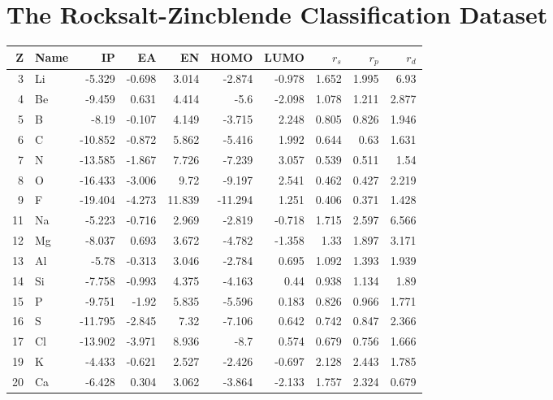 \documentclass[11pt,oneside,czech,american]{book} %
\theoremstyle{definition} %
\theoremstyle{definition}
\begin{document}
\chapter{The Rocksalt-Zincblende Classification Dataset}
\begin{table}[H]
	\begin{tabular}{rlrrrrrrrr}
		\hline
		Z & Name   &      IP &     EA &     EN &    HOMO &   LUMO &   $r_s$ &   $r_p$ &   $r_d$ \\
		\hline
		3 & Li     &  -5.329 & -0.698 &  3.014 &  -2.874 & -0.978 & 1.652 & 1.995 & 6.93  \\
		4 & Be     &  -9.459 &  0.631 &  4.414 &  -5.6   & -2.098 & 1.078 & 1.211 & 2.877 \\
		5 & B      &  -8.19  & -0.107 &  4.149 &  -3.715 &  2.248 & 0.805 & 0.826 & 1.946 \\
		6 & C      & -10.852 & -0.872 &  5.862 &  -5.416 &  1.992 & 0.644 & 0.63  & 1.631 \\
		7 & N      & -13.585 & -1.867 &  7.726 &  -7.239 &  3.057 & 0.539 & 0.511 & 1.54  \\
		8 & O      & -16.433 & -3.006 &  9.72  &  -9.197 &  2.541 & 0.462 & 0.427 & 2.219 \\
		9 & F      & -19.404 & -4.273 & 11.839 & -11.294 &  1.251 & 0.406 & 0.371 & 1.428 \\
		11 & Na     &  -5.223 & -0.716 &  2.969 &  -2.819 & -0.718 & 1.715 & 2.597 & 6.566 \\
		12 & Mg     &  -8.037 &  0.693 &  3.672 &  -4.782 & -1.358 & 1.33  & 1.897 & 3.171 \\
		13 & Al     &  -5.78  & -0.313 &  3.046 &  -2.784 &  0.695 & 1.092 & 1.393 & 1.939 \\
		14 & Si     &  -7.758 & -0.993 &  4.375 &  -4.163 &  0.44  & 0.938 & 1.134 & 1.89  \\
		15 & P      &  -9.751 & -1.92  &  5.835 &  -5.596 &  0.183 & 0.826 & 0.966 & 1.771 \\
		16 & S      & -11.795 & -2.845 &  7.32  &  -7.106 &  0.642 & 0.742 & 0.847 & 2.366 \\
		17 & Cl     & -13.902 & -3.971 &  8.936 &  -8.7   &  0.574 & 0.679 & 0.756 & 1.666 \\
		19 & K      &  -4.433 & -0.621 &  2.527 &  -2.426 & -0.697 & 2.128 & 2.443 & 1.785 \\
		20 & Ca     &  -6.428 &  0.304 &  3.062 &  -3.864 & -2.133 & 1.757 & 2.324 & 0.679 \\

\end{tabular}
\end{table}
\end{document}

